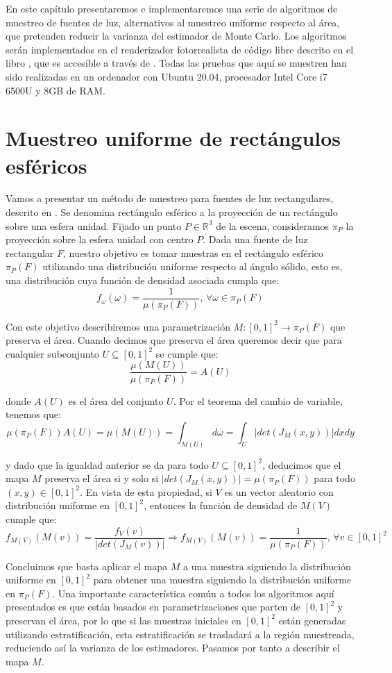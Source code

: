 En este capítulo presentaremos e implementaremos una serie de algoritmos de muestreo de fuentes de luz, alternativos al muestreo uniforme respecto al área, que pretenden reducir la varianza del estimador de Monte Carlo. Los algoritmos serán implementados en el renderizador fotorrealista de código libre descrito en el libro \cite{Pharr2016}, que es accesible a través de \cite{pbrtCode}. Todas las pruebas que aquí se muestren han sido realizadas en un ordenador con Ubuntu 20.04, procesador Intel Core i7 6500U y 8GB de RAM.

\section{Muestreo uniforme de rectángulos esféricos}

Vamos a presentar un método de muestreo para fuentes de luz rectangulares, descrito en \cite{Urena2013}. Se denomina rectángulo esférico a la proyección de un rectángulo sobre una esfera unidad. Fijado un punto $P\in\mathds{R}^3$ de la escena, consideramos $\pi_P$ la proyección sobre la esfera unidad con centro $P$. Dada una fuente de luz rectangular $F$, nuestro objetivo es tomar muestras en el rectángulo esférico $\pi_P(F)$ utilizando una distribución uniforme respecto al ángulo sólido, esto es, una distribución cuya función de densidad asociada cumpla que:
$$f_{\omega}(\omega) = \frac{1}{\mu(\pi_P(F))}\text{, }\forall \omega\in\pi_P(F)$$

Con este objetivo describiremos una parametrización $M:[0,1]^2\rightarrow \pi_P(F)$ que preserva el área. Cuando decimos que preserva el área queremos decir que para cualquier subconjunto $U\subseteq [0,1]^2$ se cumple que:
$$\frac{\mu(M(U))}{\mu(\pi_P(F))} = A(U)$$

donde $A(U)$ es el área del conjunto $U$. Por el teorema del cambio de variable, tenemos que:
$$\mu(\pi_P(F))A(U) = \mu(M(U)) = \int_{M(U)}d\omega = \int_{U}|det(J_M(x,y))| dxdy $$

y dado que la igualdad anterior se da para todo $U\subseteq [0,1]^2$, deducimos que el mapa $M$ preserva el área si y solo si $|det(J_M(x,y))| = \mu(\pi_P(F))$ para todo $(x,y)\in[0,1]^2$. En vista de esta propiedad, si $V$ es un vector aleatorio con distribución uniforme en $[0,1]^2$, entonces la función de densidad de $M(V)$ cumple que:
$$f_{M(V)}(M(v)) = \frac{f_V(v)}{|det(J_M(v))|}\Rightarrow f_{M(V)}(M(v)) =\frac{1}{\mu(\pi_P(F))} \text{, }\forall v\in [0,1]^2$$

Concluimos que basta aplicar el mapa $M$ a una muestra siguiendo la distribución uniforme en $[0,1]^2$ para obtener una muestra siguiendo la distribución uniforme en $\pi_P(F)$.  Una importante característica común a todos los algoritmos aquí presentados es que están basados en parametrizaciones que parten de $[0,1]^2$ y preservan el área, por lo que si las muestras iniciales en $[0,1]^2$ están generadas utilizando estratificación, esta estratificación se trasladará a la región muestreada, reduciendo así la varianza de los estimadores. Pasamos por tanto a describir el mapa $M$.\\

